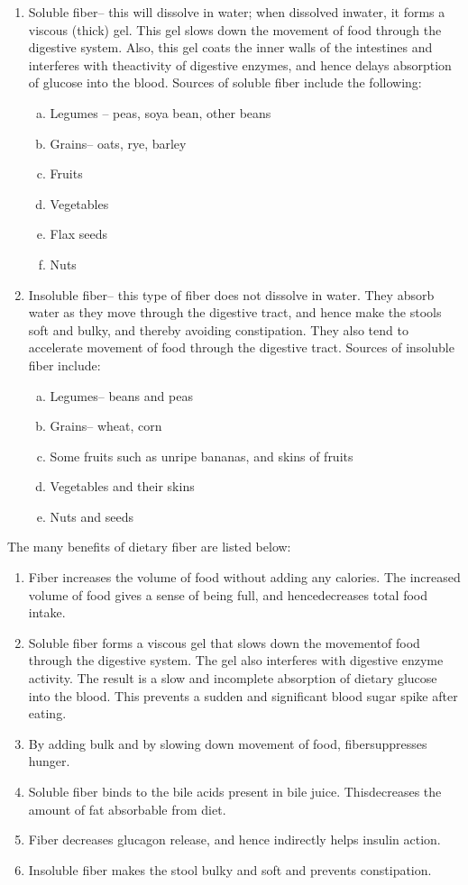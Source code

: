 \begin{enumerate}
\itemsep=0pt
\item Soluble fiber– this will dissolve in water; when dissolved in\break water, it forms a viscous (thick) gel. This gel slows down the movement of food through the digestive system. Also, this gel coats the inner walls of the intestines and interferes with the\break activity of digestive enzymes, and hence delays absorption of glucose into the blood. Sources of soluble fiber include the following:
\begin{enumerate}[a)]
\itemsep=0pt
\item Legumes – peas, soya bean, other beans
\item Grains– oats, rye, barley
\item Fruits
\item Vegetables
\item Flax seeds
\item Nuts
\end{enumerate}
\item Insoluble fiber– this type of fiber does not dissolve in water. They absorb water as they move through the digestive tract, and hence make the stools soft and bulky, and thereby avoiding constipation. They also tend to accelerate movement of food through the digestive tract. Sources of insoluble fiber include:
\begin{enumerate}[a)]
\itemsep=0pt
\item Legumes– beans and peas
\item Grains– wheat, corn
\item Some fruits such as unripe bananas, and skins of fruits
\item Vegetables and their skins
\item Nuts and seeds
\end{enumerate}
\end{enumerate}

\noindent The many benefits of dietary fiber are listed below:

\begin{enumerate}[•]
\itemsep=0pt
\item Fiber increases the volume of food without adding any calories. The increased volume of food gives a sense of being full, and hence\break decreases total food intake.
\item Soluble fiber forms a viscous gel that slows down the movement\break of food through the digestive system. The gel also interferes with digestive enzyme activity. The result is a slow and incomplete abso\-rption of dietary glucose into the blood. This prevents a sudden and significant blood sugar spike after eating.
\item By adding bulk and by slowing down movement of food, fiber\break suppresses hunger.
\item Soluble fiber binds to the bile acids present in bile juice. This\break decreases the amount of fat absorbable from diet.
\item Fiber decreases glucagon release, and hence indirectly helps insulin action.
\item Insoluble fiber makes the stool bulky and soft and prevents constipation.
\end{enumerate}

